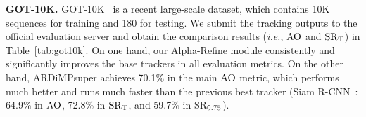 \documentclass[final]{cvpr}
\begin{document}
\begin{table}[!t]
    \caption{Comparison results on the \textit{TrackingNet test} set. 
    `Base': the base tracker; and `Base+AR': the base tracker with Alpha-Refine. 
    The best three results are marked in \textbf{\textcolor[rgb]{1,0,0}{red}}, \textbf{\textcolor[rgb]{0,1,0}{green}} and \textbf{\textcolor[rgb]{0,0,1}{blue}} bold fonts, 
    respectively. Numbers are shown in percentage (\%).}
    \centering
    \label{tab:trackingnet}
\end{table}

{\flushleft \textbf{GOT-10K.}} GOT-10K~\cite{GOT10K} is a recent large-scale dataset, which contains 
10K sequences for training and 180 
for testing. We submit the tracking outputs to the official evaluation server and obtain the 
comparison results (\emph{i.e.}, $\rm{AO}$ and $\rm{SR}_{\rm{T}}$) in Table~\ref{tab:got10k}.
On one hand, our Alpha-Refine module consistently and significantly improves the base trackers in all 
evaluation metrics. 
On the other hand, ARDiMPsuper achieves 70.1\% in the main $\rm{AO}$ metric, which performs much 
better and runs much faster than the previous best tracker (Siam R-CNN~\cite{SiamRCNN}: 64.9\% in 
$\rm{AO}$, 72.8\% in $\rm{SR}_{\rm{T}}$, and 59.7\% in SR$_{\rm{0.75}}$). 
\end{document}
